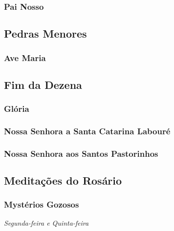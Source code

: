 \subsubsection{Pai Nosso}


\subsection{Pedras Menores}
\subsubsection{Ave Maria}


\subsection{Fim da Dezena}
\subsubsection{Glória}


\subsubsection{Nossa Senhora a Santa Catarina Labouré}\label{concebidasempecado}
\begin{paracol}{2}\switchcolumn{}\switchcolumn*{}\switchcolumn{}\end{paracol}

\subsubsection{Nossa Senhora aos Santos Pastorinhos}


\subsection{Meditações do Rosário}

\subsubsection{Mystérios Gozosos}
\begin{nscenter}\emph{Segunda-feira e Quinta-feira}\end{nscenter}

